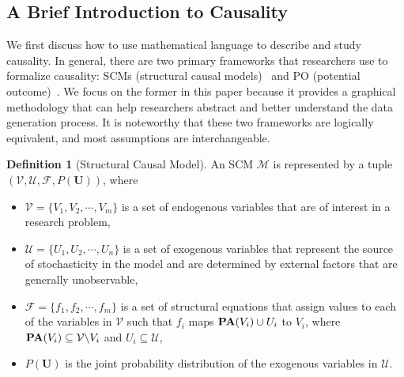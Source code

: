 \documentclass[10pt]{article} %
\theoremstyle{definition}
\newtheorem{definition}{Definition}[section]
\begin{document}
\subsection{A Brief Introduction to Causality}
We first discuss how to use mathematical language to describe and study causality. In general, there are two primary frameworks that researchers use to formalize causality: SCMs (structural causal models)~\cite{pearlCausalInferenceStatistics2009, glymourCausalInferenceStatistics2016} and PO (potential outcome)~\citep{rubinEstimatingCausalEffects1974, imbensCausalInferenceStatistics2015}. We focus on the former in this paper because it provides a graphical methodology that can help researchers abstract and better understand the data generation process. It is noteworthy that these two frameworks are logically equivalent, and most assumptions are interchangeable.
\begin{definition}[Structural Causal Model]
\label{def:scm}
An SCM $\mathcal{M}$ is represented by a tuple $\left(\mathcal{V}, \mathcal{U}, \mathcal{F}, P(\mathbf{U}) \right)$, where
\begin{itemize}
    \item $\mathcal{V} = \{V_1, V_2, \cdots, V_m\}$ is a set of endogenous variables that are of interest in a research problem,
    \item $\mathcal{U} = \{U_1, U_2, \cdots, U_n\}$ is a set of exogenous variables that represent the source of stochasticity in the model and are determined by external factors that are generally unobservable,
    \item $\mathcal{F}  = \{f_1, f_2, \cdots, f_m\}$ is a set of structural equations that assign values to each of the variables in $\mathcal{V}$ such that $f_i$ maps $\mbox{\textbf{PA}}(V_i) \cup U_i$ to $V_i$, where $\mbox{\textbf{PA}}(V_i) \subseteq \mathcal{V} \backslash V_i$ and $U_i \subseteq \mathcal{U}$,
    \item $P(\mathbf{U})$ is the joint probability distribution of the exogenous variables in $\mathcal{U}$.
\end{itemize}
\end{definition}
\end{document}
